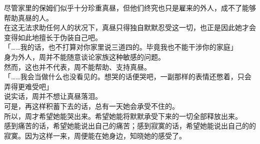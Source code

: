 尽管家里的保姆们似乎十分珍重真昼，但他们终究也只是雇来的外人，成不了能够帮助真昼的人。\\

在这无法求助任何人的状况下，真昼只得独自默默忍受这一切，也正是因此她才会变得如此地擅长于伪装自己吧。\\

「……我的话，也不打算对你家里说三道四的。毕竟我也不能干涉你的家庭」\\

身为外人，周并不能随意谈论家族这种敏感的问题。\\

然而，这也并不代表，周不能帮助、支持真昼。\\

「……我会当做什么也没看见的。想哭的话便哭吧，一副那样的表情还憋着，只会弄得更难受吧」\\

说实话，周并不想让真昼落泪。\\

可是，再这样积蓄下去的话，总有一天她会承受不住的。\\

所以，周才希望她能哭出来。希望她能将默默承受下来的一切全部释放出来。\\

感到痛苦的话，希望她能说出自己的痛苦；感到寂寞的话，希望她能说出自己的的寂寞。因为这样一来，周便能在她身边，知晓她的感受了。\\

